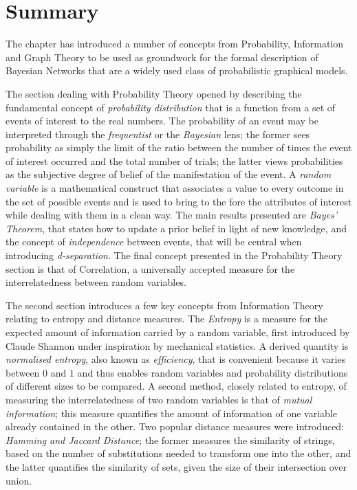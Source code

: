 \documentclass[mscthesis]{usiinfthesis}
\begin{document}





\section{Summary}
The chapter has introduced a number of concepts from Probability, Information and Graph Theory to be used as groundwork for the formal description of Bayesian Networks that are a widely used class of probabilistic graphical models.

The section dealing with Probability Theory opened by describing the fundamental concept of \textit{probability distribution} that is a function from a set of events of interest to the real numbers.
The probability of an event may be interpreted through the \textit{frequentist} or the \textit{Bayesian} lens; the former sees probability as simply the limit of the ratio between the number of times the event of interest occurred and the total number of trials; the latter views probabilities as the subjective degree of belief of the manifestation of the event.
A \textit{random variable} is a mathematical construct that associates a value to every outcome in the set of possible events and is used to bring to the fore the attributes of interest while dealing with them in a clean way.
The main results presented are \textit{Bayes' Theorem}, that states how to update a prior belief in light of new knowledge, and the concept of \textit{independence} between events, that will be central when introducing \textit{d-separation}.
The final concept presented in the Probability Theory section is that of Correlation, a universally accepted measure for the interrelatedness between random variables.

The second section introduces a few key concepts from Information Theory relating to entropy and distance measures.
The \textit{Entropy} is a measure for the expected amount of information carried by a random variable, first introduced by Claude Shannon under inspiration by mechanical statistics. 
A derived quantity is \textit{normalised entropy}, also known as \textit{efficiency}, that is convenient because it varies between $0$ and $1$ and thus enables random variables and probability distributions of different sizes to be compared.
A second method, closely related to entropy, of measuring the interrelatedness of two random variables is that of \textit{mutual information}; this measure quantifies the amount of information of one variable already contained in the other.
Two popular distance measures were introduced: \textit{Hamming and Jaccard Distance}; the former measures the similarity of strings, based on the number of substitutions needed to transform one into the other, and the latter quantifies the similarity of sets, given the size of their intersection over union.
\end{document}
